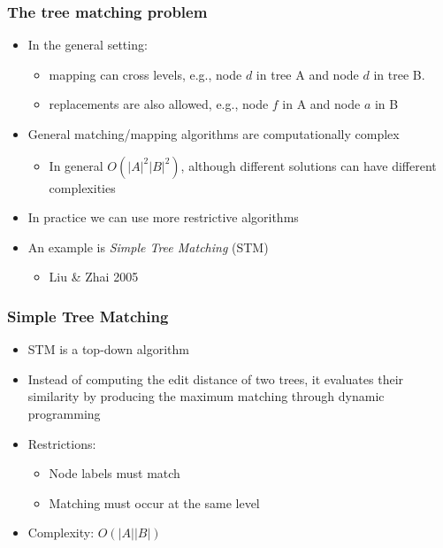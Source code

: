 \documentclass[svgnames]{beamer}
\begin{document}
\begin{frame} \frametitle{The tree matching problem}
  
    \begin{itemize}
    \item In the general setting:
        \begin{itemize}
        \item mapping can cross levels, e.g., node $d$ in tree A and node $d$
            in tree B.
        \item replacements are also allowed, e.g., node $f$ in A and node $a$
            in B
        \end{itemize}
    \item General matching/mapping algorithms are computationally complex
        \begin{itemize}
        \item In general $O(|A|^2|B|^2)$, although different solutions can have
            different complexities
        \end{itemize}
    \item In practice we can use more restrictive algorithms
    \item An example is \emph{Simple Tree Matching} (STM)
        \begin{itemize}
        \item Liu \& Zhai 2005
        \end{itemize}
    \end{itemize}

\end{frame}



\begin{frame}
    \frametitle{Simple Tree Matching}

    \begin{itemize}
    \item STM is a top-down algorithm
    \item Instead of computing the edit distance of two trees, it evaluates
        their similarity by producing the maximum matching through dynamic
        programming
    \item Restrictions:
        \begin{itemize}
        \item Node labels must match
        \item Matching must occur at the same level
        \end{itemize}
    \item Complexity: $O(|A||B|)$
    \end{itemize}

\end{frame}
\end{document}
